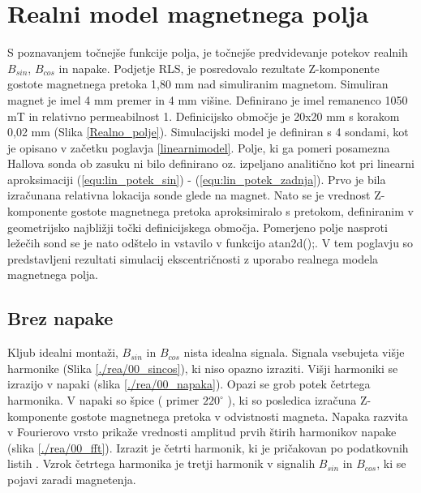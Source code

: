 \chapter{Realni model magnetnega polja}
S poznavanjem točnejše funkcije polja, je točnejše predvidevanje potekov realnih $B_{sin}$, $B_{cos}$ in napake. Podjetje RLS,  je posredovalo rezultate Z-komponente gostote magnetnega pretoka 1,80 mm nad simuliranim magnetom. Simuliran magnet je imel 4 mm premer in 4 mm višine. Definirano je imel remanenco 1050 mT in relativno permeabilnost 1.  Definicijsko območje  je 20x20 mm s korakom 0,02 mm (Slika \ref{Realno_polje}).
Simulacijski model je definiran s 4 sondami, kot je opisano v začetku poglavja \ref{linearnimodel}.
Polje, ki ga pomeri posamezna Hallova sonda ob zasuku ni bilo definirano oz. izpeljano analitično kot pri linearni aproksimaciji (\ref{equ:lin_potek_sin}) - (\ref{equ:lin_potek_zadnja}).  Prvo je bila izračunana relativna lokacija sonde glede na magnet. Nato se je vrednost Z-komponente gostote magnetnega pretoka  aproksimiralo s pretokom, definiranim v geometrijsko najbližji točki definicijskega območja.
Pomerjeno polje nasproti ležečih sond se je nato odštelo in vstavilo v funkcijo atan2d();.
V tem poglavju so predstavljeni rezultati simulacij ekscentričnosti z uporabo realnega modela magnetnega polja.
\section{Brez napake}
Kljub idealni montaži, $B_{sin}$ in $B_{cos}$ nista idealna signala.  Signala vsebujeta višje harmonike (Slika \ref{./rea/00_sincos}), ki niso opazno izraziti. Višji harmoniki se izrazijo v napaki (slika \ref{./rea/00_napaka}). Opazi se grob potek četrtega harmonika. V napaki so špice ( primer $220^{\circ}$ ), ki so posledica izračuna Z-komponente gostote  magnetnega pretoka v odvistnosti magneta. Napaka razvita v Fourierovo vrsto prikaže vrednosti amplitud prvih štirih harmonikov napake (slika \ref{./rea/00_fft}). Izrazit je četrti harmonik, ki je pričakovan po podatkovnih listih \cite{AM8192}. Vzrok četrtega harmonika je tretji harmonik v signalih  $B_{sin}$ in $B_{cos}$, ki se pojavi zaradi magnetenja.
\newpage
